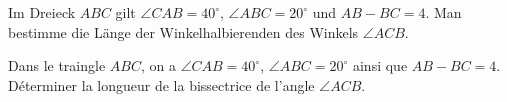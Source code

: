 Im Dreieck $ABC$ gilt $\angle CAB = 40^\circ$, $\angle ABC = 20^\circ$ und $AB- BC = 4$. Man bestimme die Länge der Winkelhalbierenden des Winkels $\angle ACB$.

\bigskip

Dans le traingle $ABC$, on a $\angle CAB = 40^\circ$, $\angle ABC = 20^\circ$ ainsi que $AB- BC = 4$. Déterminer la longueur de la bissectrice de l'angle $\angle ACB$.